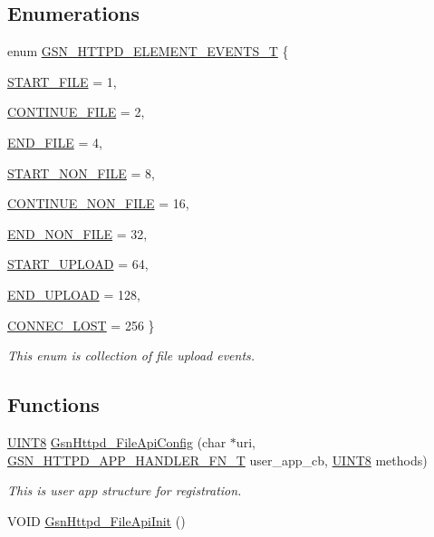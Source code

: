 \subsection*{Enumerations}
\begin{DoxyCompactItemize}
\item 
enum \hyperlink{a00511_a08d46f405dab1ea7ad33b522e3604839}{GSN\_\-HTTPD\_\-ELEMENT\_\-EVENTS\_\-T} \{ \par
\hyperlink{a00511_a08d46f405dab1ea7ad33b522e3604839ac325d42b23f8ef33736a502d7b421ea0}{START\_\-FILE} = 1, 
\par
\hyperlink{a00511_a08d46f405dab1ea7ad33b522e3604839ab6a85866da85b6c3fae86403155d44f0}{CONTINUE\_\-FILE} = 2, 
\par
\hyperlink{a00511_a08d46f405dab1ea7ad33b522e3604839aa4ee7c4def59d9b613ea29682f98ffb0}{END\_\-FILE} = 4, 
\par
\hyperlink{a00511_a08d46f405dab1ea7ad33b522e3604839a70f5ed92acb1ca2eafe9d5cf328de952}{START\_\-NON\_\-FILE} = 8, 
\par
\hyperlink{a00511_a08d46f405dab1ea7ad33b522e3604839a8717cf01fdbb8967b6195ef6063c0caa}{CONTINUE\_\-NON\_\-FILE} = 16, 
\par
\hyperlink{a00511_a08d46f405dab1ea7ad33b522e3604839ace2d0e5a6a7a2c2daed569b6f0a13077}{END\_\-NON\_\-FILE} = 32, 
\par
\hyperlink{a00511_a08d46f405dab1ea7ad33b522e3604839acaa53b49cd02fd807160c6361e8afe75}{START\_\-UPLOAD} = 64, 
\par
\hyperlink{a00511_a08d46f405dab1ea7ad33b522e3604839aca771bb97cb0a4141a3ba17c310b806b}{END\_\-UPLOAD} = 128, 
\par
\hyperlink{a00511_a08d46f405dab1ea7ad33b522e3604839aff2ca90177a8cc5573c189cbcd276f24}{CONNEC\_\-LOST} = 256
 \}
\begin{DoxyCompactList}\small\item\em This enum is collection of file upload events. \end{DoxyCompactList}\end{DoxyCompactItemize}
\subsection*{Functions}
\begin{DoxyCompactItemize}
\item 
\hyperlink{a00660_gab27e9918b538ce9d8ca692479b375b6a}{UINT8} \hyperlink{a00511_a441fc9a4b5b9fdbbb3cf0bf5aef0ec9d}{GsnHttpd\_\-FileApiConfig} (char $\ast$uri, \hyperlink{a00511_aa8074d4aaa1ef8e6443148ee81fd9aea}{GSN\_\-HTTPD\_\-APP\_\-HANDLER\_\-FN\_\-T} user\_\-app\_\-cb, \hyperlink{a00660_gab27e9918b538ce9d8ca692479b375b6a}{UINT8} methods)
\begin{DoxyCompactList}\small\item\em This is user app structure for registration. \end{DoxyCompactList}\item 
VOID \hyperlink{a00511_a5a475d0de83591cbe67285ea6d1ea0c4}{GsnHttpd\_\-FileApiInit} ()
\end{DoxyCompactItemize}


